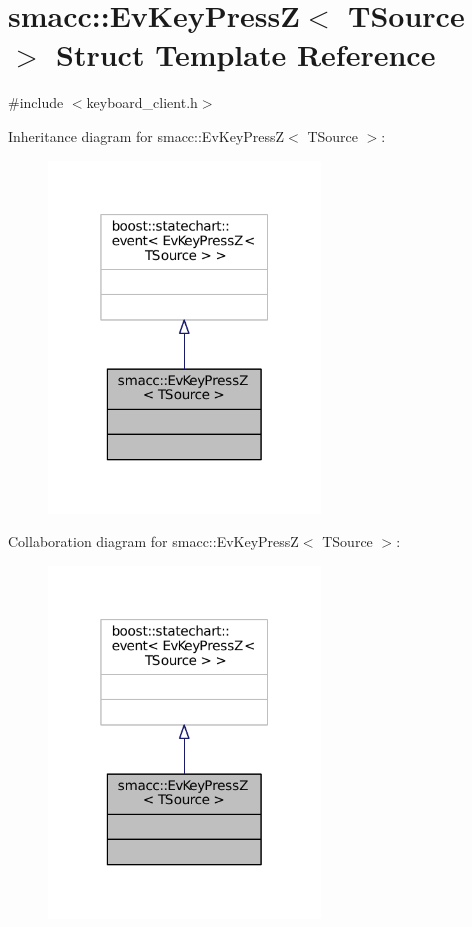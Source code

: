\hypertarget{structsmacc_1_1EvKeyPressZ}{}\section{smacc\+:\+:Ev\+Key\+PressZ$<$ T\+Source $>$ Struct Template Reference}
\label{structsmacc_1_1EvKeyPressZ}


{\ttfamily \#include $<$keyboard\+\_\+client.\+h$>$}



Inheritance diagram for smacc\+:\+:Ev\+Key\+PressZ$<$ T\+Source $>$\+:
\nopagebreak
\begin{figure}[H]
\begin{center}
\leavevmode
\includegraphics[width=205pt]{structsmacc_1_1EvKeyPressZ__inherit__graph}
\end{center}
\end{figure}


Collaboration diagram for smacc\+:\+:Ev\+Key\+PressZ$<$ T\+Source $>$\+:
\nopagebreak
\begin{figure}[H]
\begin{center}
\leavevmode
\includegraphics[width=205pt]{structsmacc_1_1EvKeyPressZ__coll__graph}
\end{center}
\end{figure}


